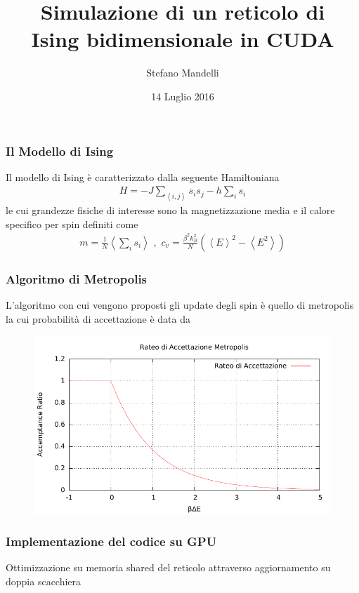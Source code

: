 \documentclass{beamer}
\title[Simulazione Ising 2D]
{Simulazione di un reticolo di \\ Ising bidimensionale in CUDA}
\author{Stefano Mandelli}
\date{14 Luglio 2016}
\begin{document}

	\begin{frame}
 		\maketitle
	\end{frame}
 


	\begin{frame}
		\frametitle{Il Modello di Ising}
		Il modello di Ising \`e caratterizzato dalla seguente Hamiltoniana
		\begin{eqnarray}
			H = -J \sum_{\left\langle i,j \right\rangle} s_i s_j -h\sum_i s_i
		\end{eqnarray}
		le cui grandezze fisiche di interesse sono la magnetizzazione media e il calore specifico per spin definiti come
		\begin{eqnarray}
			m=\frac{1}{N}\left\langle \sum_i s_i\right\rangle \,\,,\,\, c_v = \frac{\beta^2 k_B^2}{N} \left(\left\langle E\right\rangle^2 - \left\langle E^2\right\rangle \right)
		\end{eqnarray}
	\end{frame}

	\begin{frame}
		\frametitle{Algoritmo di Metropolis}
		L'algoritmo con cui vengono proposti gli update degli spin \`e quello di metropolis la cui probabilit\`a di accettazione \`e data da
		\begin{figure}
			\includegraphics[scale=0.85]{../acc_rat.pdf}
		\end{figure}
	\end{frame}

	
	\begin{frame}
		\frametitle{Implementazione del codice su GPU}
		Ottimizzazione su memoria shared del reticolo attraverso aggiornamento su doppia scacchiera
		
	\end{frame}
\end{document}
